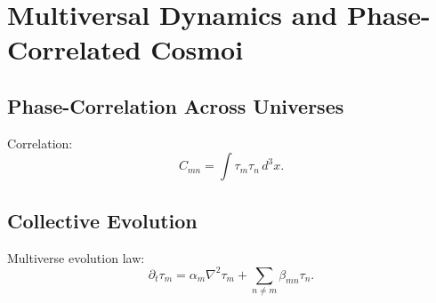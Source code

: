 \chapter{Multiversal Dynamics and Phase-Correlated Cosmoi}

\section{Phase-Correlation Across Universes}
Correlation:
\[
C_{mn} = \int \tau_m \tau_n\, d^3x.
\]

\section{Collective Evolution}
Multiverse evolution law:
\[
\partial_t \tau_m = \alpha_m \nabla^2 \tau_m + \sum_{n\neq m}\beta_{mn}\tau_n.
\]
